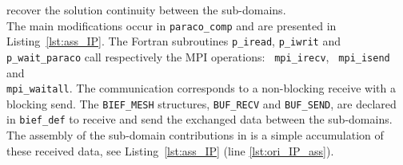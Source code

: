 \begin{enumerate}
recover the solution continuity between the sub-domains.
\\
%
The main modifications occur in \texttt{paraco\_comp} and are presented in Listing~\ref{lst:ass_IP}.
The Fortran subroutines \texttt{p\_iread}, \texttt{p\_iwrit} and  \texttt{p\_wait\_paraco}
call respectively the MPI operations:
\texttt{ mpi\_irecv}, \texttt{ mpi\_isend} and \\ \texttt{mpi\_waitall}.
The communication corresponds to a non-blocking receive 
with a blocking send.
The \texttt{BIEF\_MESH} structures, \texttt{BUF\_RECV} and \texttt{BUF\_SEND}, 
are declared in \texttt{bief\_def} to receive and send the 
exchanged data between the sub-domains.
The assembly of the sub-domain contributions in  
is a simple accumulation of these received data,
see Listing~\ref{lst:ass_IP} (line \ref{lst:ori_IP_ass}).


\end{enumerate}

